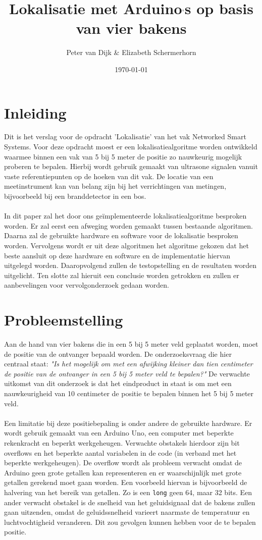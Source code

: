 \documentclass{article}
\author{Peter van Dijk \& Elizabeth Schermerhorn}
\date{\today}
\title{Lokalisatie met Arduino$`$s op basis van vier bakens}
\begin{document}
\maketitle
\newpage
\tableofcontents
\clearpage
\section{Inleiding}
Dit is het verslag voor de opdracht 'Lokalisatie' van het vak Networked Smart Systems. Voor deze opdracht moest er een lokalisatiealgoritme worden ontwikkeld waarmee binnen een vak van 5 bij 5 meter de positie zo nauwkeurig mogelijk proberen te bepalen. Hierbij wordt gebruik gemaakt van ultrasone signalen vanuit vaste referentiepunten op de hoeken van dit vak. De locatie van een meetinstrument kan van belang zijn bij het verrichtingen van metingen, bijvoorbeeld bij een branddetector in een bos. \\
\\
In dit paper zal het door ons ge\"{i}mplementeerde lokalisatiealgoritme besproken worden. Er zal eerst een afweging worden gemaakt tussen bestaande algoritmen. Daarna zal de gebruikte hardware en software voor de lokalisatie besproken worden. Vervolgens wordt er uit deze algoritmen het algoritme gekozen dat het beste aansluit op deze hardware en software en de implementatie hiervan uitgelegd worden. Daaropvolgend zullen de testopstelling en de resultaten worden uitgelicht. Ten slotte zal hieruit een conclusie worden getrokken en zullen er aanbevelingen voor vervolgonderzoek gedaan worden.


\section{Probleemstelling}
Aan de hand van vier bakens die in een 5 bij 5 meter veld geplaatst worden, moet de positie van de ontvanger bepaald worden. De onderzoeksvraag die hier centraal staat: \textit{"Is het mogelijk om met een afwijking kleiner dan tien centimeter de positie van de ontvanger in een 5 bij 5 meter veld te bepalen?"}
De verwachte uitkomst van dit onderzoek is dat het eindproduct in staat is om met een nauwkeurigheid van 10 centimeter de positie te bepalen binnen het 5 bij 5 meter veld. \\
\\
Een limitatie bij deze positiebepaling is onder andere de gebruikte hardware. Er wordt gebruik gemaakt van een Arduino Uno, een computer met beperkte rekenkracht en beperkt werkgeheugen.\cite{uno}
Verwachte obstakels hierdoor zijn bit overflows en het beperkte aantal variabelen in de code (in verband met het beperkte werkgeheugen). De overflow wordt als probleem verwacht omdat de Arduino geen grote getallen kan representeren en er waarschijnlijk met grote getallen gerekend moet gaan worden. Een voorbeeld hiervan is bijvoorbeeld de halvering van het bereik van getallen. Zo is een \texttt{long} geen 64, maar 32 bits.\cite{long} Een ander verwacht obstakel is de snelheid van het geluidsignaal dat de bakens zullen gaan uitzenden, omdat de geluidssnelheid varieert naarmate de temperatuur en luchtvochtigheid veranderen. Dit zou gevolgen kunnen hebben voor de te bepalen positie.  
\end{document}
